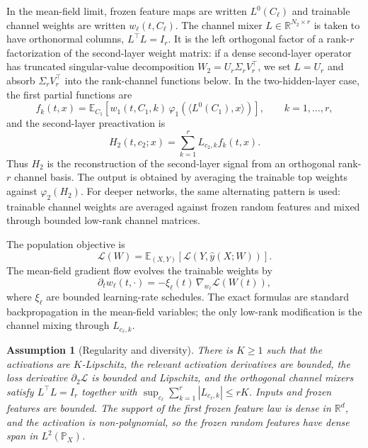 \documentclass{article}
\newtheorem{assumption}[theorem]{Assumption}
\newcommand{\R}{\mathbb{R}}
\newcommand{\E}{\mathbb{E}}
\newcommand{\Pp}{\mathbb{P}}
\newcommand{\calL}{\mathcal{L}}
\newcommand{\scrL}{\mathcal{L}}
\begin{document}
In the mean-field limit, frozen feature maps are written $L^0(C_\ell)$ and trainable channel weights are written $w_\ell(t,C_\ell)$. The channel mixer $L\in\R^{N_2\times r}$ is taken to have orthonormal columns, $L^\top L=I_r$. It is the left orthogonal factor of a rank-$r$ factorization of the second-layer weight matrix: if a dense second-layer operator has truncated singular-value decomposition $W_2=U_r\Sigma_r V_r^\top$, we set $L=U_r$ and absorb $\Sigma_r V_r^\top$ into the rank-channel functions below. In the two-hidden-layer case, the first partial functions are
\begin{equation}
f_k(t,x)=\E_{C_1}\left[w_1(t,C_1,k)\,\varphi_1\left(\langle L^0(C_1),x\rangle\right)\right],
\qquad k=1,\ldots,r,
\end{equation}
and the second-layer preactivation is
\begin{equation}
H_2(t,c_2;x)=\sum_{k=1}^r L_{c_2,k} f_k(t,x).
\end{equation}
Thus $H_2$ is the reconstruction of the second-layer signal from an orthogonal rank-$r$ channel basis. The output is obtained by averaging the trainable top weights against $\varphi_2(H_2)$. For deeper networks, the same alternating pattern is used: trainable channel weights are averaged against frozen random features and mixed through bounded low-rank channel matrices.

The population objective is
\begin{equation}
\scrL(W)=\E_{(X,Y)}\left[\calL\left(Y,\hat y(X;W)\right)\right].
\end{equation}
The mean-field gradient flow evolves the trainable weights by
\begin{equation}
\partial_t w_\ell(t,\cdot)=-\xi_\ell(t)\,\nabla_{w_\ell}\scrL(W(t)),
\label{eq:generic-flow}
\end{equation}
where $\xi_\ell$ are bounded learning-rate schedules. The exact formulas are standard backpropagation in the mean-field variables; the only low-rank modification is the channel mixing through $L_{c_\ell,k}$.

\begin{assumption}[Regularity and diversity]
\label{assump:regularity}
There is $K\ge1$ such that the activations are $K$-Lipschitz, the relevant activation derivatives are bounded, the loss derivative $\partial_2\calL$ is bounded and Lipschitz, and the orthogonal channel mixers satisfy $L^\top L=I_r$ together with $\sup_{c_\ell}\sum_{k=1}^r |L_{c_\ell,k}|\le rK$. Inputs and frozen features are bounded. The support of the first frozen feature law is dense in $\R^d$, and the activation is non-polynomial, so the frozen random features have dense span in $L^2(\Pp_X)$.
\end{assumption}
\end{document}
